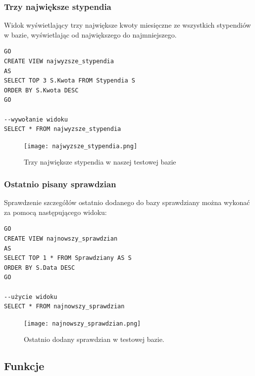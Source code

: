 \documentclass[60pt]{article}
\begin{document}
\subsubsection{Trzy największe stypendia}

Widok wyświetlający trzy największe kwoty miesięczne ze wszystkich stypendiów w bazie, wyświetlając od największego do najmniejszego. 

\begin{verbatim}
GO
CREATE VIEW najwyzsze_stypendia
AS
SELECT TOP 3 S.Kwota FROM Stypendia S
ORDER BY S.Kwota DESC
GO

--wywołanie widoku
SELECT * FROM najwyzsze_stypendia
\end{verbatim}

\begin{figure}[h]
    \begin{center}
      \texttt{[image: najwyzsze\_stypendia.png]}
      \caption{Trzy największe stypendia w naszej testowej bazie}
      \label{Trzy największe stypendia w naszej testowej bazie}
    \end{center}
\end{figure}

\subsubsection{Ostatnio pisany sprawdzian}

Sprawdzenie szczegółów ostatnio dodanego do bazy sprawdziany można wykonać za pomocą następującego widoku:

\begin{verbatim}
GO
CREATE VIEW najnowszy_sprawdzian
AS
SELECT TOP 1 * FROM Sprawdziany AS S
ORDER BY S.Data DESC
GO

--użycie widoku
SELECT * FROM najnowszy_sprawdzian
\end{verbatim}

\begin{figure}[h]
    \begin{center}
      \texttt{[image: najnowszy\_sprawdzian.png]}
      \caption{Ostatnio dodany sprawdzian w testowej bazie.}
      \label{Ostatnio dodany sprawdzian w testowej bazie.}
    \end{center}
\end{figure}

\subsection{Funkcje}
\end{document}
